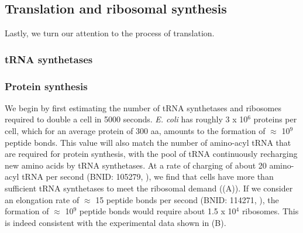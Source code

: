 \subsection{Translation and ribosomal synthesis}

Lastly, we turn our attention to the process of translation.

\subsubsection{tRNA synthetases}

\subsubsection{Protein synthesis}

We begin by first estimating the number of tRNA synthetases and ribosomes
required to  double a cell in 5000 seconds.  \textit{E. coli} has roughly 3 x
10$^6$ proteins per cell, which for an average protein of 300 aa, amounts to the
formation of $\approx$ 10$^9$ peptide bonds. This value will also match the
number of amino-acyl tRNA that are required for protein synthesis, with the pool
of tRNA continuously recharging new amino acids by tRNA synthetases. At a rate
of charging of about 20 amino-acyl tRNA per second (BNID: 105279,
\cite{milo2010}), we find that cells have more than sufficient tRNA synthetases
to meet the ribosomal demand ((A)). If we consider an
elongation rate of $\approx$ 15 peptide bonds per second (BNID: 114271,
\cite{milo2010, dai2016}), the formation of $\approx$ 10$^9$ peptide bonds would
require about 1.5 x 10$^4$ ribosomes. This is indeed consistent with the
experimental data shown in (B).

